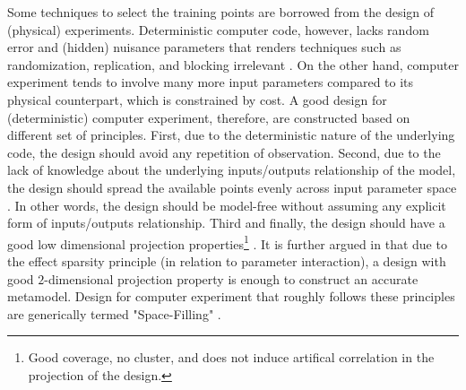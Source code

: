 Some techniques to select the training points are borrowed from the design of (physical) experiments.
Deterministic computer code, however, lacks random error and (hidden) nuisance parameters that renders techniques such as randomization, replication, and blocking irrelevant \cite{Santner2003}.
On the other hand, computer experiment tends to involve many more input parameters compared to its physical counterpart, which is constrained by cost. 
A good design for (deterministic) computer experiment, therefore, are constructed based on different set of principles.
First, due to the deterministic nature of the underlying code, the design should avoid any repetition of observation. 
Second, due to the lack of knowledge about the underlying inputs/outputs relationship of the model, the design should spread the available points evenly across input parameter space \cite{Santner2003}.
In other words, the design should be model-free without assuming any explicit form of inputs/outputs relationship.
Third and finally, the design should have a good low dimensional projection properties\footnote{Good coverage, no cluster, and does not induce artifical correlation in the projection of the design.} \cite{Jin2003,Damblin2013}.
It is further argued in \cite{Damblin2013} that due to the effect sparsity principle (in relation to parameter interaction), 
a design with good $2$-dimensional projection property is enough to construct an accurate metamodel.   
Design for computer experiment that roughly follows these principles are generically termed "Space-Filling" \cite{Simpson2001a,Jin2003,Santner2003,Chen2006,Damblin2013}.


